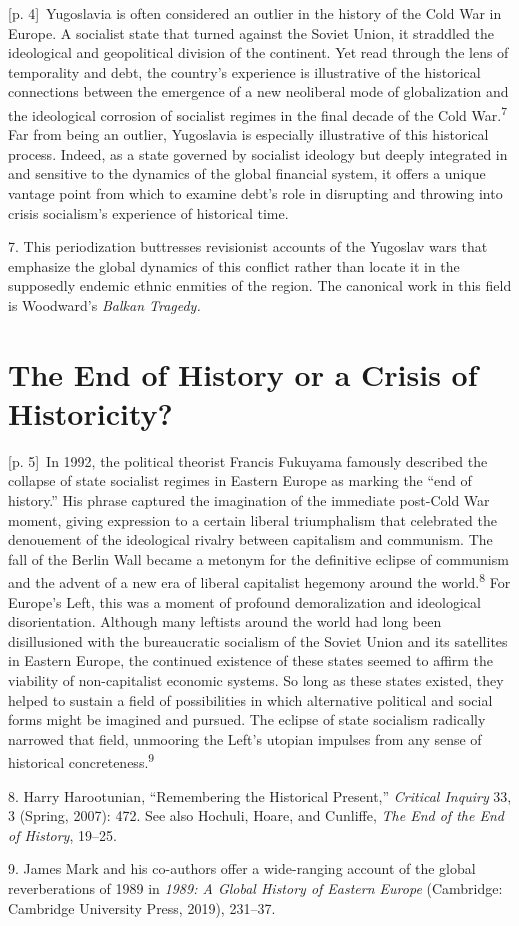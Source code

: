 \documentclass[10pt,a4paper]{article}
\begin{document}
{\scriptsize\color{gray} [p. 4]}\ Yugoslavia is often considered an outlier in the history of the Cold War in Europe. A socialist state that turned against the Soviet Union, it straddled the ideological and geopolitical division of the continent. Yet read through the lens of temporality and debt, the country’s experience is illustrative of the historical connections between the emergence of a new neoliberal mode of globalization and the ideological corrosion of socialist regimes in the final decade of the Cold War.\nobreak\textsuperscript{7} Far from being an outlier, Yugoslavia is especially illustrative of this historical process. Indeed, as a state governed by socialist ideology but deeply integrated in and sensitive to the dynamics of the global financial system, it offers a unique vantage point from which to examine debt’s role in disrupting and throwing into crisis socialism’s experience of historical time.\par{\small 7. This periodization buttresses revisionist accounts of the Yugoslav wars that emphasize the global dynamics of this conflict rather than locate it in the supposedly endemic ethnic enmities of the region. The canonical work in this field is Woodward’s \textit{Balkan Tragedy.}\par}
\section*{The End of History or a Crisis of Historicity?}
{\scriptsize\color{gray} [p. 5]}\ In 1992, the political theorist Francis Fukuyama famously described the collapse of state socialist regimes in Eastern Europe as marking the “end of history.” His phrase captured the imagination of the immediate post-Cold War moment, giving expression to a certain liberal triumphalism that celebrated the denouement of the ideological rivalry between capitalism and communism. The fall of the Berlin Wall became a metonym for the definitive eclipse of communism and the advent of a new era of liberal capitalist hegemony around the world.\nobreak\textsuperscript{8} For Europe’s Left, this was a moment of profound demoralization and ideological disorientation. Although many leftists around the world had long been disillusioned with the bureaucratic socialism of the Soviet Union and its satellites in Eastern Europe, the continued existence of these states seemed to affirm the viability of non-capitalist economic systems. So long as these states existed, they helped to sustain a field of possibilities in which alternative political and social forms might be imagined and pursued. The eclipse of state socialism radically narrowed that field, unmooring the Left’s utopian impulses from any sense of historical concreteness.\nobreak\textsuperscript{9}\par{\small 8. Harry Harootunian, “Remembering the Historical Present,” \textit{Critical Inquiry} 33, 3 (Spring, 2007): 472. See also Hochuli, Hoare, and Cunliffe, \textit{The End of the End of History}, 19–25.\par}{\small 9. James Mark and his co-authors offer a wide-ranging account of the global reverberations of 1989 in \textit{1989: A Global History of Eastern Europe} (Cambridge: Cambridge University Press, 2019), 231–37.\par}
\end{document}
